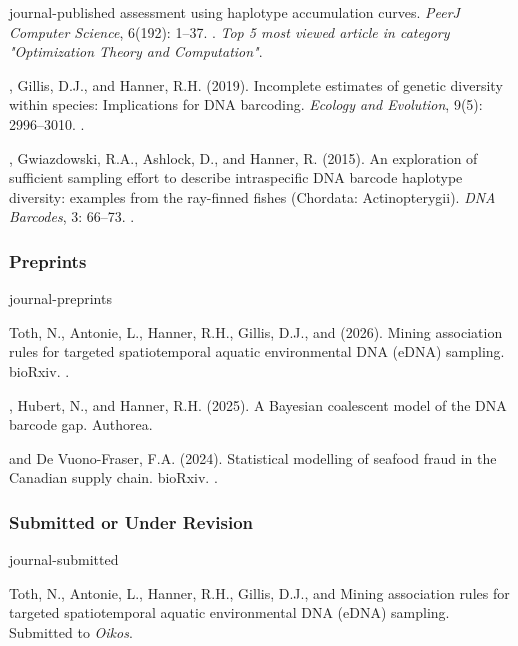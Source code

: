 \begin{revlist}[itemsep=0.45\baselineskip]{journal-published}
  assessment using haplotype accumulation curves. \textit{PeerJ Computer
  Science}, 6(192): 1--37.
  .
  \textit{Top 5 most viewed article in category "Optimization Theory and Computation"}.
\item \me, Gillis, D.J., and Hanner, R.H. (2019). Incomplete estimates of genetic
  diversity within species: Implications for DNA barcoding. \textit{Ecology and
  Evolution}, 9(5): 2996--3010.
  .
\item \me, Gwiazdowski, R.A., Ashlock, D., and Hanner, R. (2015). An exploration
  of sufficient sampling effort to describe intraspecific DNA barcode haplotype
  diversity: examples from the ray-finned fishes (Chordata: Actinopterygii).
  \textit{DNA Barcodes}, 3: 66--73.
  .
\end{revlist}

\subsubsection{Preprints}
\begin{revlist}[itemsep=0.45\baselineskip]{journal-preprints}
\item \dsup Toth, N., Antonie, L., Hanner, R.H., Gillis, D.J., and \me (2026). Mining
  association rules for targeted spatiotemporal aquatic environmental DNA (eDNA)
  sampling. bioRxiv.
  .
\item \me, Hubert, N., and Hanner, R.H. (2025). A Bayesian coalescent model of the
  DNA barcode gap. Authorea. 
\item \me and \dsup De Vuono-Fraser, F.A. (2024). Statistical modelling of
  seafood fraud in the Canadian supply chain. bioRxiv. .
\end{revlist}

\subsubsection{Submitted or Under Revision}
\begin{revlist}{journal-submitted}
\item \dsup Toth, N., Antonie, L., Hanner, R.H., Gillis, D.J., and \me Mining
  association rules for targeted spatiotemporal aquatic environmental DNA (eDNA)
  sampling. Submitted to \textit{Oikos}.
\end{revlist}

